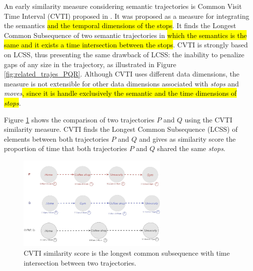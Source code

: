 \documentclass[12pt]{article}
\begin{document}
An early similarity measure considering semantic trajectories is Common Visit Time Interval (CVTI) proposed in \cite{Kang:2009:SMT:1529282.1529580}. It was proposed as a measure for integrating the semantics \hl{and the temporal dimensions of the stops}. It finds the Longest Common Subsequence of two semantic trajectories in \hl{which the semantics is the same and it exists a time intersection between the stops}.
CVTI is strongly based on LCSS, thus presenting the same drawback of LCSS: the inability to penalize gaps of any size in the trajectory, as illustrated in Figure \ref{fig:related_trajes_PQR}. Although CVTI uses different data dimensions, the measure is not extensible for other data dimensions associated with \emph{stops} and \emph{moves}\hl{, since it is handle exclusively the semantic and the time dimensions of \emph{stops}}.

Figure \ref{fig:related_trajes_CVTI} shows the comparison of two trajectories $P$ and $Q$ using the CVTI similarity measure. CVTI finds the Longest Common Subsequence (LCSS) of elements between both trajectories $P$ and $Q$ and gives as similarity score the proportion of time that both trajectories $P$ and $Q$ shared the same \emph{stops}.

\begin{figure}[h]
\centering
\includegraphics[width=0.65\textwidth]{Related_Works/Semantic_Trajectories_(CVTI).jpg}
\caption{\label{fig:related_trajes_CVTI}CVTI similarity score is the longest common subsequence with time intersection between two trajectories.}
\end{figure}
\end{document}
